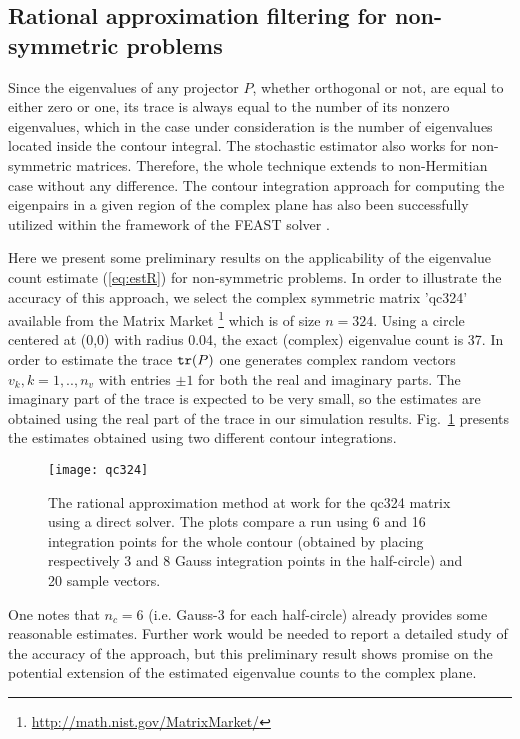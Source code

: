 \documentclass[12pt]{article}		\usepackage{tabls,multirow}
\def\trace{\mbox{\tt tr}}
\begin{document}
\subsection{Rational approximation filtering for non-symmetric problems}
 
Since the eigenvalues of any projector $P$, whether orthogonal or not,
are equal to either zero or one, its trace is always equal to the
number of its nonzero eigenvalues, which in the case under
consideration is the number of eigenvalues located inside the contour
integral. The stochastic estimator also works for non-symmetric
matrices. Therefore, the whole technique extends to non-Hermitian case
without any difference. The contour integration approach for computing
the eigenpairs in a given region of the complex plane has also been
successfully utilized within the framework of the FEAST solver
\cite{laux}.


Here we present some preliminary results on the applicability of the
eigenvalue count estimate (\ref{eq:estR}) for non-symmetric problems.
In order to illustrate the accuracy of this approach, we select the complex symmetric matrix 'qc324' available
from the Matrix Market
\footnote{\url{http://math.nist.gov/MatrixMarket/}} which is of size
$n = 324$. Using a circle centered at (0,0) with radius 0.04, the
exact (complex) eigenvalue count is 37. In order to estimate the trace
${\trace(P)}$ one generates complex random vectors $v_k, k=1,..,n_v$
with entries $\pm 1$ for both the real and imaginary parts. The
imaginary part of the trace is expected to be very small, so the
estimates are obtained using the real part of the trace in our
simulation results.  Fig.~\ref{fig:qc324} presents the estimates
obtained using two different contour integrations.
\begin{figure}[hbt]
\centerline{ 
\texttt{[image: qc324]}} 
\caption{The rational approximation method at work for the qc324 
matrix using a direct solver.
The plots compare a run using 6 and 16 integration points for the 
whole contour (obtained by placing 
respectively 3 and 8 Gauss integration points in the half-circle) and 20
sample vectors. 
\label{fig:qc324}}
\end{figure}
One notes that $n_c=6$ (i.e. Gauss-3 for each half-circle) already 
provides some reasonable estimates.
Further work would be needed to report a detailed study of the accuracy of the approach, but 
this preliminary result shows promise on the potential extension of
the estimated eigenvalue counts to the complex plane.
\end{document}
